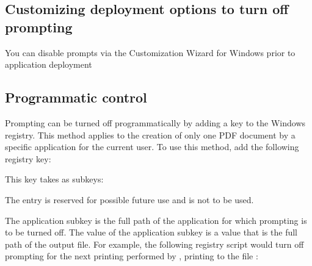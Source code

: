 \documentclass[letterpaper,12pt,english,openany,oneside]{sphinxmanual}
\begin{document}
\subsection{Customizing deployment options to turn off prompting}
\label{\detokenize{Distiller_WinIntro:customizing-deployment-options-to-turn-off-prompting}}
You can disable prompts via the Customization Wizard for Windows prior to application deployment


\subsection{Programmatic control}
\label{\detokenize{Distiller_WinIntro:programmatic-control}}
Prompting can be turned off programmatically by adding a key to the Windows registry. This method applies to the creation of only one PDF document by a specific application for the current user. To use this method, add the following registry key:

\begin{sphinxVerbatim}[commandchars=\\\{\}]
 
\end{sphinxVerbatim}

This key takes as subkeys:

\begin{sphinxVerbatim}[commandchars=\\\{\}]

\end{sphinxVerbatim}

The  entry is reserved for possible future use and is not to be used.

The application subkey is the full path of the application for which prompting is to be turned off. The value of the application subkey is a  value that is the full path of the output file. For example, the following registry script would turn off prompting for the next printing performed by  , printing to the file  :

\begin{sphinxVerbatim}[commandchars=\\\{\}]
    
 \PYG{p}{[} \PYG{p}{]}

   
\end{sphinxVerbatim}
\end{document}
